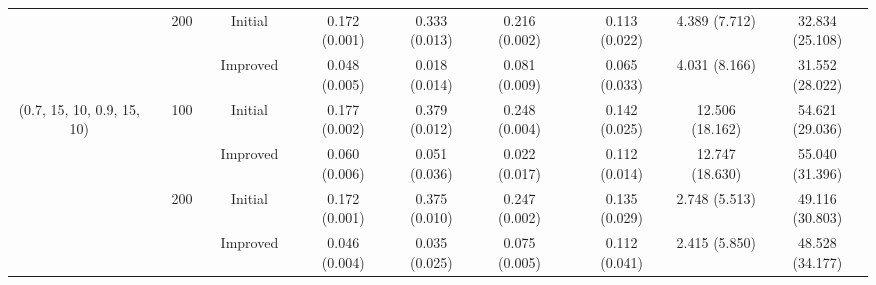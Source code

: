 \documentclass[12pt]{article}
\newcommand{\0}{{\bf 0}}
\begin{document}
\begin{table}[tbp]
\begin{center}
{\begin{tabular}{ccccccccccccc}
                                                          &  & 200                  &  & Initial                     &  & 0.172 (0.001)   & 0.333 (0.013)  & 0.216 (0.002)  &  & 0.113 (0.022) & 4.389 (7.712)   & 32.834 (25.108) \\
                                                          &  &                      &  & Improved                    &  & 0.048 (0.005)   & 0.018 (0.014)  & 0.081 (0.009)  &  & 0.065 (0.033) & 4.031 (8.166)   & 31.552 (28.022) \\ \hline
(0.7, 15, 10, 0.9, 15, 10)                                &  & 100                  &  & Initial                     &  & 0.177 (0.002)   & 0.379 (0.012)  & 0.248 (0.004)  &  & 0.142 (0.025) & 12.506 (18.162) & 54.621 (29.036) \\ 
                                                          &  &                      &  & Improved                    &  & 0.060 (0.006)    & 0.051 (0.036)  & 0.022 (0.017)  &  & 0.112 (0.014) & 12.747 (18.630)  & 55.040 (31.396)  \\
                                                          &  & 200                  &  & Initial                     &  & 0.172 (0.001)   & 0.375 (0.010)   & 0.247 (0.002)  &  & 0.135 (0.029) & 2.748 (5.513)   & 49.116 (30.803) \\
\multicolumn{1}{l}{}                                      &  & \multicolumn{1}{l}{} &  & Improved                    &  & 0.046 (0.004)   & 0.035 (0.025)  & 0.075 (0.005)  &  & 0.112 (0.041) & 2.415 (5.850)    & 48.528 (34.177) \\ \hline
\end{tabular}


		}	
	\end{center}
	\vspace{-0.5cm}
\end{table}
\end{document}

